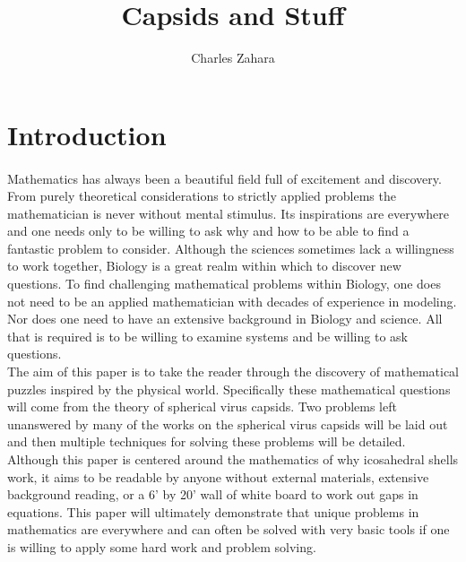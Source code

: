 \documentclass[12pt,letter]{article}
\begin{document}
\title{Capsids and Stuff}
\author{Charles Zahara}
\maketitle

\section{Introduction}


\paragraph{}
Mathematics has always been a beautiful field full of excitement and discovery. From purely theoretical considerations to strictly applied problems the mathematician is never without mental stimulus. Its inspirations are everywhere and one needs only to be willing to ask why and how to be able to find a fantastic problem to consider. Although the sciences sometimes lack a willingness to work together, Biology is a great realm within which to discover new questions. To find challenging mathematical problems within Biology, one does not need to be an applied mathematician with decades of experience in modeling. Nor does one need to have an extensive background in Biology and science. All that is required is to be willing to examine systems and be willing to ask questions.\\

The aim of this paper is to take the reader through the discovery of mathematical puzzles inspired by the physical world. Specifically these mathematical questions will come from the theory of spherical virus capsids. Two problems left unanswered by many of the works on the spherical virus capsids will be laid out and then multiple techniques for solving these problems will be detailed. Although this paper is centered around the mathematics of why icosahedral shells work, it aims to be readable by anyone without external materials, extensive background reading, or a 6' by 20' wall of white board to work out gaps in equations. This paper will ultimately demonstrate that unique problems in mathematics are everywhere and can often be solved with very basic tools if one is willing to apply some hard work and problem solving.\\
\end{document}
